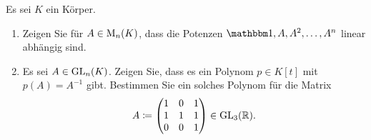 \documentclass[a4paper, 10pt]{scrartcl}
\begin{document}
\begin{question}[subtitle = Cayley-Hamilton]
  Es sei $K$ ein Körper.
  \begin{enumerate}
    \item
      Zeigen Sie für $A \in \operatorname{M}_{n}(K)$, dass die Potenzen $\Id, A, A^2, \dotsc, A^n$ linear abhängig sind.
    \item
      Es sei $A \in \operatorname{GL}_{n}(K)$.
      Zeigen Sie, dass es ein Polynom $p \in K[t]$ mit $p(A) = A^{-1}$ gibt.
      Bestimmen Sie ein solches Polynom für die Matrix
      \[
                  A
        \coloneqq \begin{pmatrix}
                    1 & 0 & 1 \\
                    1 & 1 & 1 \\
                    0 & 0 & 1
                  \end{pmatrix}
        \in \operatorname{GL}_{3}(\mathbb{R}).
      \]
  \end{enumerate}
\end{question}
\end{document}
